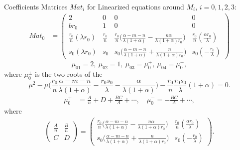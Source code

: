 \documentclass[a4paper,11pt]{article}
\begin{document}
Coefficients Matrices $Mat_i$ for Linearized equations around $M_i$, $i=0,1,2,3$: 
\begin{align*}
 Mat_0 &= \begin{pmatrix}
          2 & 0 & 0 & 0 \\
          br_0 & 1 & 0 & 0\\
          \frac{r_0}{n}(\lambda r_0) & \frac{r_0}{n} & \frac{r_0}{n}\Big(\frac{\alpha-m-n}{\lambda(1+\alpha)} - \frac{n\alpha}{\lambda(1+\alpha)r_0}\Big) & \frac{r_0}{n}(\frac{\alpha r_0}{\lambda})\\
          s_0(\lambda r_0) & s_0 & s_0\Big(\frac{\alpha-m-n}{\lambda(1+\alpha)} + \frac{n}{\lambda(1+\alpha)r_0}\Big) & s_0(-\frac{r_0}{\lambda})
         \end{pmatrix}
\end{align*}
\begin{equation}
 \mu_{01}=2, \ \mu_{02}=1, \ \mu_{03}=\mu_0^+, \ \mu_{04}=\mu_0^-,
\end{equation}
where $\mu_0^\pm$ is the two roots of the 
$$ \mu^2 - \mu\Big(\frac{r_0}{n}\frac{\alpha-m-n}{\lambda(1+\alpha)} - \frac{r_0s_0}{\lambda} - \frac{\alpha}{\lambda(1+\alpha)}\Big) - \frac{r_0}{n}\frac{r_0s_0}{\lambda}(1+\alpha) = 0.$$
\begin{align*}
 \mu_0^+ &= \frac{A}{n} + D + \frac{BC}{A} + \cdots, \quad \mu_0^- = - \frac{BC}{A} + \cdots,
\end{align*}
where
\begin{align*}
 \begin{pmatrix} \frac{A}{n} & \frac{B}{n} \\ C & D \end{pmatrix} = 
 \begin{pmatrix}
 \frac{r_0}{n}\Big(\frac{\alpha-m-n}{\lambda(1+\alpha)} - \frac{n\alpha}{\lambda(1+\alpha)r_0}\Big) & \frac{r_0}{n}(\frac{\alpha r_0}{\lambda})\\
 s_0\Big(\frac{\alpha-m-n}{\lambda(1+\alpha)} + \frac{n}{\lambda(1+\alpha)r_0}\Big) & s_0(-\frac{r_0}{\lambda})
 \end{pmatrix}.
\end{align*}
\end{document}
